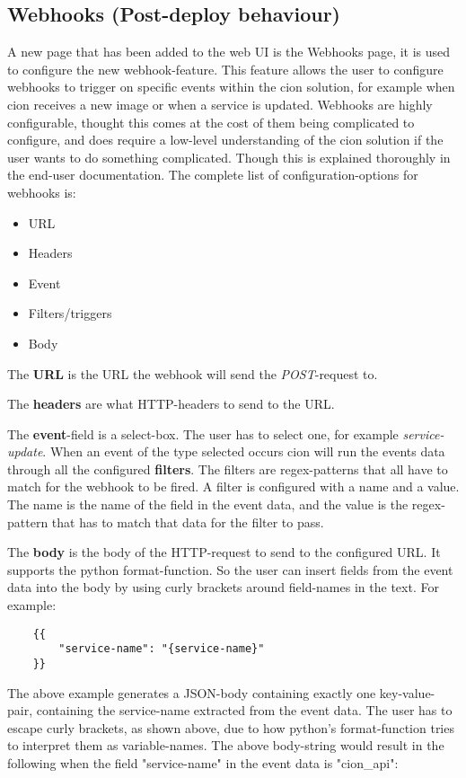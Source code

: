 \subsection{Webhooks (Post-deploy behaviour)}
A new page that has been added to the web UI is the Webhooks page, it is used to configure the new webhook-feature. This feature allows the user to configure webhooks to trigger on specific events within the cion solution, for example when cion receives a new image or when a service is updated. 
Webhooks are highly configurable, thought this comes at the cost of them being complicated to configure, and does require a low-level understanding of the cion solution if the user wants to do something complicated. Though this is explained thoroughly in the end-user documentation. The complete list of configuration-options for webhooks is:

\begin{itemize}
    \item URL
    \item Headers
    \item Event
    \item Filters/triggers
    \item Body
\end{itemize}

The \textbf{URL} is the URL the webhook will send the \textit{POST}-request to.

The \textbf{headers} are what HTTP-headers to send to the URL.

The \textbf{event}-field is a select-box. The user has to select one, for example \textit{service-update}. 
When an event of the type selected occurs cion will run the events data through all the configured \textbf{filters}. The filters are regex-patterns that all have to match for the webhook to be fired. A filter is configured with a name and a value. The name is the name of the field in the event data, and the value is the regex-pattern that has to match that data for the filter to pass.

The \textbf{body} is the body of the HTTP-request to send to the configured URL. It supports the python format-function. So the user can insert fields from the event data into the body by using curly brackets around field-names in the text. For example:

\begin{verbatim}
    {{
        "service-name": "{service-name}"
    }}
\end{verbatim}

The above example generates a JSON-body containing exactly one key-value-pair, containing the service-name extracted from the event data. 
The user has to escape curly brackets, as shown above, due to how python's format-function tries to interpret them as variable-names.
The above body-string would result in the following when the field "service-name" in the event data is "cion\_api":

